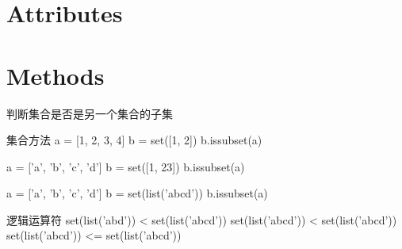 \chapter{Attributes}
\chapter{Methods}
判断集合是否是另一个集合的子集
\begin{py}{集合方法}
a = [1, 2, 3, 4]
b = set([1, 2])
b.issubset(a)

a = ['a', 'b', 'c', 'd']
b = set([1, 23])
b.issubset(a)

a = ['a', 'b', 'c', 'd']
b = set(list('abcd'))
b.issubset(a)
\end{py}

\begin{py}{逻辑运算符}
set(list('abd')) < set(list('abcd'))
set(list('abcd')) < set(list('abcd'))
set(list('abcd')) <= set(list('abcd'))
\end{py}



